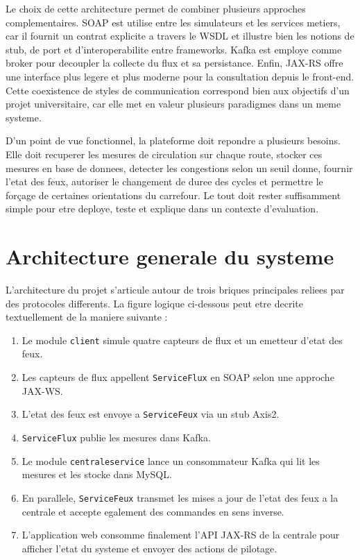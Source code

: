 \documentclass[12pt,a4paper]{report}
\begin{document}
Le choix de cette architecture permet de combiner plusieurs approches complementaires. SOAP est utilise entre les simulateurs et les services metiers, car il fournit un contrat explicite a travers le WSDL et illustre bien les notions de stub, de port et d'interoperabilite entre frameworks. Kafka est employe comme broker pour decoupler la collecte du flux et sa persistance. Enfin, JAX-RS offre une interface plus legere et plus moderne pour la consultation depuis le front-end. Cette coexistence de styles de communication correspond bien aux objectifs d'un projet universitaire, car elle met en valeur plusieurs paradigmes dans un meme systeme.

D'un point de vue fonctionnel, la plateforme doit repondre a plusieurs besoins. Elle doit recuperer les mesures de circulation sur chaque route, stocker ces mesures en base de donnees, detecter les congestions selon un seuil donne, fournir l'etat des feux, autoriser le changement de duree des cycles et permettre le for\c{c}age de certaines orientations du carrefour. Le tout doit rester suffisamment simple pour etre deploye, teste et explique dans un contexte d'evaluation.

\chapter{Architecture generale du systeme}
L'architecture du projet s'articule autour de trois briques principales reliees par des protocoles differents. La figure logique ci-dessous peut etre decrite textuellement de la maniere suivante :

\begin{enumerate}
    \item Le module \texttt{client} simule quatre capteurs de flux et un emetteur d'etat des feux.
    \item Les capteurs de flux appellent \texttt{ServiceFlux} en SOAP selon une approche JAX-WS.
    \item L'etat des feux est envoye a \texttt{ServiceFeux} via un stub Axis2.
    \item \texttt{ServiceFlux} publie les mesures dans Kafka.
    \item Le module \texttt{centraleservice} lance un consommateur Kafka qui lit les mesures et les stocke dans MySQL.
    \item En parallele, \texttt{ServiceFeux} transmet les mises a jour de l'etat des feux a la centrale et accepte egalement des commandes en sens inverse.
    \item L'application web consomme finalement l'API JAX-RS de la centrale pour afficher l'etat du systeme et envoyer des actions de pilotage.
\end{enumerate}
\end{document}
